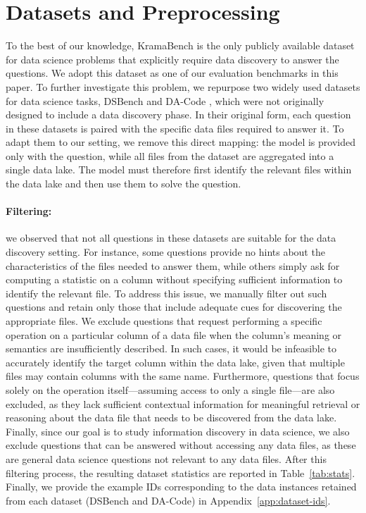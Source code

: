 \section{Datasets and Preprocessing}
\label{app:dataset}


To the best of our knowledge, KramaBench \citep{lai2025kramabenchbenchmarkaisystems} is the only publicly available dataset for data science problems that explicitly require data discovery to answer the questions. We adopt this dataset as one of our evaluation benchmarks in this paper. To further investigate this problem, we repurpose two widely used datasets for data science tasks, DSBench \citep{jing2025dsbench} and DA-Code \citep{huang-etal-2024-da}, which were not originally designed to include a data discovery phase. In their original form, each question in these datasets is paired with the specific data files required to answer it. To adapt them to our setting, we remove this direct mapping: the model is provided only with the question, while all files from the dataset are aggregated into a single data lake. The model must therefore first identify the relevant files within the data lake and then use them to solve the question.

\paragraph{Filtering:} we observed that not all questions in these datasets are suitable for the data discovery setting. For instance, some questions provide no hints about the characteristics of the files needed to answer them, while others simply ask for computing a statistic on a column without specifying sufficient information to identify the relevant file. To address this issue, we manually filter out such questions and retain only those that include adequate cues for discovering the appropriate files. We exclude questions that request performing a specific operation on a particular column of a data file when the column’s meaning or semantics are insufficiently described. In such cases, it would be infeasible to accurately identify the target column within the data lake, given that multiple files may contain columns with the same name. Furthermore, questions that focus solely on the operation itself—assuming access to only a single file—are also excluded, as they lack sufficient contextual information for meaningful retrieval or reasoning about the data file that needs to be discovered from the data lake. Finally, since our goal is to study information discovery in data science, we also exclude questions that can be answered without accessing any data files, as these are general data science questions not relevant to any data files. After this filtering process, the resulting dataset statistics are reported in Table~\ref{tab:stats}. Finally, we provide the example IDs corresponding to the data instances retained from each dataset (DSBench and DA-Code) in Appendix~\ref{app:dataset-ids}.

